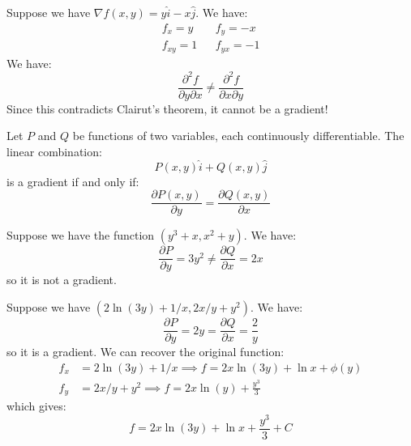 \begin{itemize}
\begin{example}
        Suppose we have $\nabla f(x,y) = y\hat{i} - x\hat{j}$. We have:
        \begin{align}
            f_x = y && f_y = -x \\ 
            f_{xy} = 1 && f_{yx} = -1
        \end{align}
        We have:
        \begin{equation}
            \frac{\partial^2 f}{\partial y\partial x} \neq \frac{\partial^2 f}{\partial x\partial y}
        \end{equation}
        Since this contradicts Clairut's theorem, it cannot be a gradient!
    \end{example}
    \begin{theorem}
        Let $P$ and $Q$ be functions of two variables, each continuously differentiable. The linear combination:
        \begin{equation}
            P(x,y) \hat{i} + Q(x,y)\hat{j}
        \end{equation}
        is a gradient if and only if:
        \begin{equation}
            \frac{\partial P(x,y)}{\partial y} = \frac{\partial Q(x,y)}{\partial x}
        \end{equation}
    \end{theorem}
    \begin{example}
        Suppose we have the function $(y^3+x, x^2 + y)$. We have:
        \begin{equation}
            \frac{\partial P}{\partial y} = 3y^2 \neq \frac{\partial Q}{\partial x}= 2x
        \end{equation}
        so it is not a gradient.
    \end{example}
    \begin{example}
        Suppose we have $(2\ln(3y) + 1/x, 2x/y + y^2)$. We have:
        \begin{equation}
            \frac{\partial P}{\partial y} = 2y = \frac{\partial Q}{\partial x} = \frac{2}{y}
        \end{equation}
        so it is a gradient. We can recover the original function:
        \begin{align}
            f_x &= 2\ln(3y)+1/x \implies f = 2x\ln(3y)+\ln x + \phi(y) \\ 
            f_y &= 2x/y + y^2 \implies f = 2x\ln(y) + \frac{y^3}{3}
        \end{align}
        which gives:
        \begin{equation}
            f = 2x\ln(3y) + \ln x + \frac{y^3}{3} + C
        \end{equation}
    \end{example}
\end{itemize}